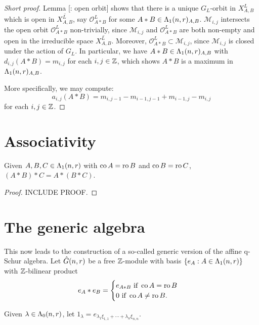 \documentclass[a4paper, 11pt]{report}
\begin{document}
\begin{proof}[Short proof]
Lemma [\needsreference : open orbit] shows that there is a unique $G_L$-orbit in $X_{A,B}^L$ which is open in $\overline{X_{A,B}^L}$, say $\mathcal{O}_{A\ast B}^L$ for some $A\ast B\in\Lambda_1(n,r)_{A,B}$. $\mathcal{M}_{i,j}$ intersects the open orbit $\mathcal{O}_{A\ast B}^L$ non-trivially, since $\mathcal{M}_{i,j}$ and $\mathcal{O}_{A\ast B}^L$ are both non-empty and open in the irreducible space $\overline{X_{A,B}^L}$. Moreover, $\mathcal{O}_{A\ast B}^L\subset \mathcal{M}_{i,j}$, since $\mathcal{M}_{i,j}$ is closed under the action of $G_L$. In particular, we have $A\ast B\in \Lambda_1(n,r)_{A,B}$ with $d_{i,j}(A\ast B) = m_{i,j}$ for each $i,j\in\mathbb{Z}$, which shows $A\ast B$ is a maximum in $\Lambda_1(n,r)_{A,B}$.

More specifically, we may compute:
\begin{equation*}
a_{i,j}(A\ast B) = m_{i,j-1} - m_{i-1,j-1} + m_{i-1,j} - m_{i,j}
\end{equation*}
for each $i,j\in\mathbb{Z}$.
\end{proof}

\section{Associativity}

\begin{proposition}\label{proposition:associativity-maximum}
Given $A,B,C\in\Lambda_1(n,r)$ with $\operatorname{co}{A}=\operatorname{ro}{B}$ and $\operatorname{co}{B}=\operatorname{ro}{C}$, $(A\ast B)\ast C = A\ast (B\ast C)$.
\end{proposition}
\begin{proof}
INCLUDE PROOF.
\end{proof}

\section{The generic algebra}

This now leads to the construction of a so-called generic version of the affine q-Schur algebra. Let $\hat{G}(n,r)$ be a free $\mathbb{Z}$-module with basis $\{e_A:A\in\Lambda_1(n,r)\}$ with $\mathbb{Z}$-bilinear product
\begin{equation*}
e_A\ast e_B = \begin{cases}
e_{A\ast B} \text{ if } \operatorname{co}{A}=\operatorname{ro}{B}\\
0 \text{ if } \operatorname{co}{A}\neq \operatorname{ro}{B}.
\end{cases}
\end{equation*}

Given $\lambda\in\Lambda_0(n,r)$, let $1_\lambda = e_{\lambda_1\xi_{1,1} + \cdots + \lambda_n\xi_{n,n}}$.
\end{document}
